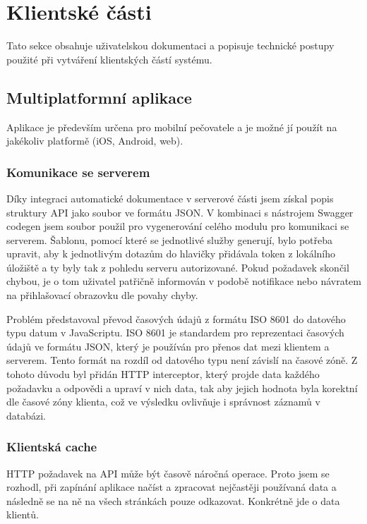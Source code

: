 \documentclass[
  glossaries,
]{kidiplom}
\begin{document}
\newpage

\section{Klientské části}
Tato sekce obsahuje uživatelskou dokumentaci a popisuje technické postupy použité při vytváření klientských částí systému.

\subsection{Multiplatformní aplikace}
Aplikace je především určena pro mobilní pečovatele a je možné jí použít na jakékoliv platformě (iOS, Android, web).

\subsubsection{Komunikace se serverem}
Díky integraci automatické dokumentace v serverové části jsem získal popis struktury API jako soubor ve formátu JSON. V kombinaci s nástrojem Swagger codegen jsem soubor použil pro vygenerování celého modulu pro komunikaci se serverem. Šablonu, pomocí které se jednotlivé služby generují, bylo potřeba upravit, aby k jednotlivým dotazům do hlavičky přidávala token z lokálního úložiště a ty byly tak z pohledu serveru autorizované. Pokud požadavek skončil chybou, je o tom uživatel patřičně informován v podobě notifikace nebo návratem na přihlašovací obrazovku dle povahy chyby.

Problém představoval převod časových údajů z formátu ISO 8601 \cite{15} do datového typu datum v JavaScriptu. ISO 8601 je standardem pro reprezentaci časových údajů ve formátu JSON, který je používán pro přenos dat mezi klientem a serverem. Tento formát na rozdíl od datového typu není závislí na časové zóně. Z tohoto důvodu byl přidán HTTP interceptor, který projde data každého požadavku a odpovědi a upraví v nich data, tak aby jejich hodnota byla korektní dle časové zóny klienta, což ve výsledku ovlivňuje i správnost záznamů v databázi.

\subsubsection{Klientská cache}
HTTP požadavek na API může být časově náročná operace. Proto jsem se rozhodl, při zapínání aplikace načíst a zpracovat nejčastěji používaná data a následně se na ně na všech stránkách pouze odkazovat. Konkrétně jde o data klientů. 
\end{document}
